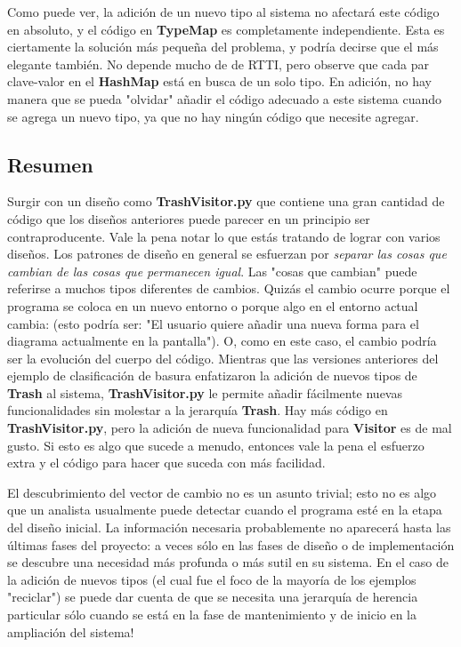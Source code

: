 Como puede ver, la adición de un nuevo tipo al sistema no afectará este código en absoluto, y el código en \textbf{TypeMap} es completamente independiente. Esta es ciertamente la solución más pequeña del problema, y podría decirse que el más elegante también. No depende mucho de de RTTI, pero observe que cada par clave-valor en el \textbf{HashMap} está en busca de un solo tipo. En adición, no hay manera que se pueda "olvidar" añadir el código adecuado a este sistema cuando se agrega un nuevo tipo, ya que no hay ningún código que necesite agregar.       \newline

\subsection*{Resumen}
\label{subsec:Resumen}

Surgir %
con un diseño como \textbf{TrashVisitor.py} que contiene una gran cantidad de código que los diseños anteriores puede parecer en un principio ser contraproducente. Vale la pena notar lo que estás tratando de lograr con varios diseños. Los patrones de diseño en general se esfuerzan por \textit{separar las cosas que cambian de las cosas que permanecen igual}. Las "cosas que cambian" puede referirse a muchos tipos diferentes de cambios. Quizás el cambio ocurre porque el programa se coloca en un nuevo entorno o porque algo en el entorno actual cambia: (esto podría ser: "El usuario quiere añadir una nueva forma para el diagrama actualmente en la pantalla"). O, como en este caso, el cambio podría ser la evolución del cuerpo del código. Mientras que las versiones anteriores del ejemplo de clasificación de basura enfatizaron la adición de nuevos tipos de \textbf{Trash} al sistema, \textbf{TrashVisitor.py} le permite añadir fácilmente nuevas funcionalidades sin molestar a la jerarquía \textbf{Trash}. Hay más código en \textbf{TrashVisitor.py}, pero la adición de nueva funcionalidad para \textbf{Visitor} es de mal gusto. Si esto es algo que sucede a menudo, entonces vale la pena el esfuerzo extra y el código para hacer que suceda con más facilidad. \newline

El descubrimiento del vector de cambio no es un asunto trivial; esto no es algo que un analista usualmente puede detectar cuando el programa esté en la etapa del diseño inicial. La información necesaria probablemente no aparecerá hasta las últimas fases del proyecto: a veces sólo en las fases de diseño o de implementación se descubre una necesidad más profunda o más sutil en su sistema. En el caso de la adición de nuevos tipos (el cual fue el foco de la mayoría de los ejemplos "reciclar") se puede dar cuenta de que se necesita una jerarquía de herencia particular sólo cuando se está en la fase de mantenimiento y de inicio en la ampliación del sistema! \newline


